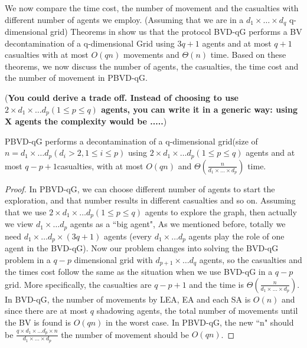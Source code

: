 We now compare the time cost, the number of movement and the casualties with different number of agents we employ. (Assuming that we are in a $d_1\times \ldots \times d_q$ q-dimensional grid)
Theorems in \cite{Cai} show us that the protocol BVD-qG performs a BV decontamination of a q-dimensional Grid using $3q+1$ agents and at most $q+1$ casualties with at most $O(qn)$ movements and $\Theta(n)$ time. Based on these theorems, we now discuss the number of agents, the casualties, the time cost and the number of movement in PBVD-qG.

({\bf You could derive a trade off. Instead of choosing to use   $2\times d_1\times \ldots d_p (1\leq p\leq q)$ agents, you can write it in a generic way: using X agents the complexity would be .....})
\begin{theorem}
PBVD-qG performs a decontamination of a q-dimensional grid(size of $n=d_1\times \ldots d_p(d_i>2, 1\leq i\leq p)$ using $2\times d_1\times \ldots d_p (1\leq p\leq q)$ agents and at most $q-p+1$casualties, with at most $O(qn)$ and $\Theta(\frac{n}{d_1\times\ldots\times d_p})$ time.
\end{theorem}

\begin{proof}
In PBVD-qG, we can choose different number of agents to start the exploration, and that number results in different casualties and so on. Assuming that we use $2\times d_1\times \ldots d_p (1\leq p\leq q)$ agents to explore the graph, then actually we view $d_1\times \ldots d_p$ agents as a ``big agent", As we mentioned before, totally we need $d_1\times \ldots d_p\times (3q+1)$ agents (every $d_1\times\ldots d_p$ agents play the role of one agent in the BVD-qG). Now our problem changes into solving the BVD-qG problem in a $q-p$ dimensional grid with $d_{p+1}\times \ldots d_q$ agents, so the casualties and the times cost follow the same as the situation when we use BVD-qG in a $q-p$ grid. More specifically, the casualties are $q-p+1$ and the time is $\Theta(\frac{n}{d_1\times\ldots\times d_p})$. In BVD-qG, the number of movements by LEA, EA and each SA is $O(n)$ and since there are at most $q$ shadowing agents, the total number of movements until the BV is found is $O(qn)$ in the worst case. In PBVD-qG, the new ``n" should be $\frac{q\times d_1\times\ldots d_p\times n}{d_1\times\ldots\times d_p}$ the number of movement should be $O(qn)$.  
\end{proof}

